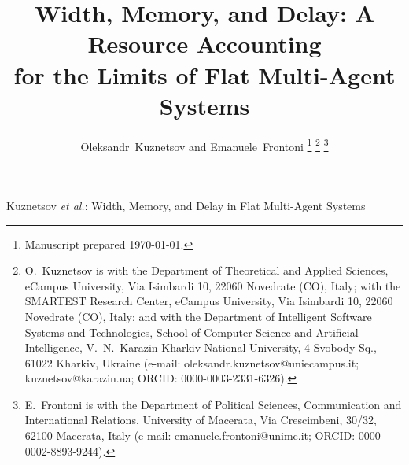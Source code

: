 \documentclass[journal]{IEEEtran}
\begin{document}
\title{Width, Memory, and Delay: A Resource Accounting\\ for the Limits of Flat Multi-Agent Systems}

\author{Oleksandr~Kuznetsov and Emanuele~Frontoni
\thanks{Manuscript prepared \today.}
\thanks{O.~Kuznetsov is with the Department of Theoretical and Applied Sciences,
eCampus University, Via Isimbardi 10, 22060 Novedrate (CO), Italy; with the
SMARTEST Research Center, eCampus University, Via Isimbardi 10, 22060 Novedrate
(CO), Italy; and with the Department of Intelligent Software Systems and
Technologies, School of Computer Science and Artificial Intelligence,
V.~N.~Karazin Kharkiv National University, 4 Svobody Sq., 61022 Kharkiv,
Ukraine (e-mail: oleksandr.kuznetsov@uniecampus.it; kuznetsov@karazin.ua;
ORCID: 0000-0003-2331-6326).}
\thanks{E.~Frontoni is with the Department of Political Sciences, Communication
and International Relations, University of Macerata, Via Crescimbeni, 30/32,
62100 Macerata, Italy (e-mail: emanuele.frontoni@unimc.it; ORCID:
0000-0002-8893-9244).}}

%
{Kuznetsov \MakeLowercase{\textit{et al.}}: Width, Memory, and Delay in Flat Multi-Agent Systems}

\maketitle
\end{document}
